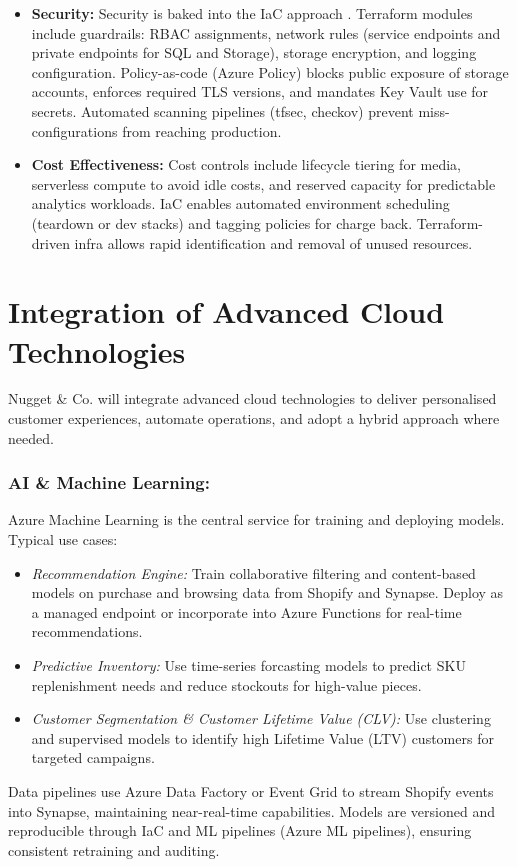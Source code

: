 \documentclass[12pt, a4paper, twoside]{article} %
\begin{document}
\begin{itemize}
\item \textbf{Security:} Security is baked into the IaC approach \citep{verdet2025}. Terraform modules include guardrails: RBAC assignments, network rules (service endpoints and private endpoints for SQL and Storage), storage encryption, and logging configuration. Policy-as-code (Azure Policy) blocks public exposure of storage accounts, enforces required TLS versions, and mandates Key Vault use for secrets. Automated scanning pipelines (tfsec, checkov) prevent miss-configurations from reaching production.
\item \textbf{Cost Effectiveness:} Cost controls include lifecycle tiering for media, serverless compute to avoid idle costs, and reserved capacity for predictable analytics workloads. IaC enables automated environment scheduling (teardown or dev stacks) and tagging policies for charge back. Terraform-driven infra allows rapid identification and removal of unused resources.
\end{itemize}

\section{Integration of Advanced Cloud Technologies}
Nugget \& Co. will integrate advanced cloud technologies to deliver personalised customer experiences, automate operations, and adopt a hybrid approach where needed.
\subsubsection*{AI \& Machine Learning:}
Azure Machine Learning is the central service for training and deploying models. Typical use cases:
\begin{itemize}
\item \textit{Recommendation Engine:} Train collaborative filtering and content-based models on purchase and browsing data from Shopify and Synapse. Deploy as a managed endpoint or incorporate into Azure Functions for real-time recommendations.
\item \textit{Predictive Inventory:} Use time-series forcasting models to predict SKU replenishment needs and reduce stockouts for high-value pieces.
\item \textit{Customer Segmentation \& Customer Lifetime Value (CLV):} Use clustering and supervised models to identify high Lifetime Value (LTV) customers for targeted campaigns. 
\end{itemize}
Data pipelines use Azure Data Factory or Event Grid to stream Shopify events into Synapse, maintaining near-real-time capabilities. Models are versioned and reproducible through IaC and ML pipelines (Azure ML pipelines), ensuring consistent retraining and auditing.
\end{document}
